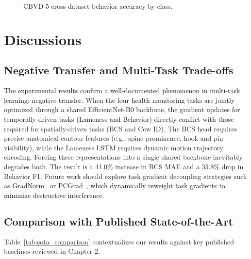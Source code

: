 \begin{figure}[H]
\centering
{}
\caption{CBVD-5 cross-dataset behavior accuracy by class.}
\label{fig:cbvd5_bar}
\end{figure}

\section{Discussions}

\subsection{Negative Transfer and Multi-Task Trade-offs}
The experimental results confirm a well-documented phenomenon in multi-task learning: negative transfer. When the four health monitoring tasks are jointly optimized through a shared EfficientNet-B0 backbone, the gradient updates for temporally-driven tasks (Lameness and Behavior) directly conflict with those required for spatially-driven tasks (BCS and Cow ID). The BCS head requires precise anatomical contour features (e.g., spine prominence, hook and pin visibility), while the Lameness LSTM requires dynamic motion trajectory encoding. Forcing these representations into a single shared backbone inevitably degrades both. The result is a 41.0\% increase in BCS MAE and a 35.8\% drop in Behavior F1. Future work should explore task gradient decoupling strategies such as GradNorm~\cite{chen2018gradnorm} or PCGrad~\cite{yu2020pcgrad}, which dynamically reweight task gradients to minimize destructive interference.

\subsection{Comparison with Published State-of-the-Art}
Table~\ref{tab:sota_comparison} contextualizes our results against key published baselines reviewed in Chapter 2.

